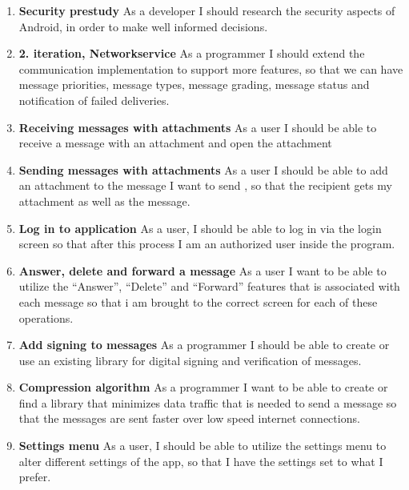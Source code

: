 \begin{enumerate}
			\item {\bf Security prestudy} As a developer I should research the security aspects of Android, in order to make well informed decisions.
			\item {\bf 2. iteration, Networkservice} As a programmer I should extend the communication implementation to support more features, so that we can have message priorities, message types, message grading, message status and notification of failed deliveries.
			\item {\bf Receiving messages with attachments} As a user I should be able to receive a message with an attachment and open the attachment
			\item {\bf Sending messages with attachments} As a user I should be able to add an attachment to the message I want to send , so that the recipient gets my attachment as well as the message.
			\item {\bf Log in to application} As a user, I should be able to log in via the login screen so that after this process I am an authorized user inside the program.
			\item {\bf Answer, delete and forward a message} As a user I want to be able to utilize the ``Answer'', ``Delete'' and ``Forward'' features that is associated with each message so that i am brought to the correct screen for each of these operations.
			\item {\bf Add signing to messages} As a programmer I should be able to create or use an existing library for digital signing and verification of messages.
			\item {\bf Compression algorithm} As a programmer I want to be able to create or find a library that minimizes data traffic that is needed to send a message so that the messages are sent faster over low speed internet connections.
			\item {\bf Settings menu} As a user, I should be able to utilize the settings menu to alter different settings of the app, so that I have the settings set to what I prefer.
			
			
			

\end{enumerate}
